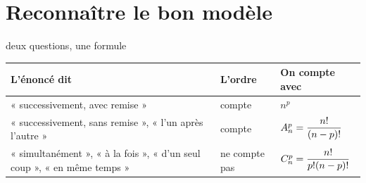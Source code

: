 \section{Reconnaître le bon modèle}

\begin{methode}{deux questions, une formule}
\begin{center}
\renewcommand{\arraystretch}{1.5}
\begin{tabular}{|L{4.3cm}|L{3.1cm}|L{3.5cm}|}
\hline
\textbf{L'énoncé dit} & \textbf{L'ordre} & \textbf{On compte avec}\\
\hline
« successivement, avec remise » & compte & $n^{p}$\\
« successivement, sans remise », « l'un après l'autre » &
compte & $\arrang{p}{n} = \dfrac{n!}{(n-p)!}$\\
« simultanément », « à la fois », « d'un seul coup », « en même temps » &
ne compte pas & $\combi{p}{n} = \dfrac{n!}{p!(n-p)!}$\\
\hline
\end{tabular}
\end{center}
\end{methode}

